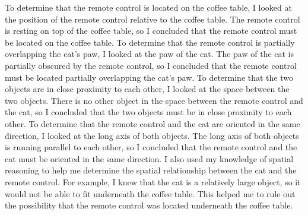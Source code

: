 \begin{enumerate}
{        To determine that the remote control is located on the coffee table, I looked at the position of the remote control relative to the coffee table. The remote control is resting on top of the coffee table, so I concluded that the remote control must be located on the coffee table.
        To determine that the remote control is partially overlapping the cat's paw, I looked at the paw of the cat. The paw of the cat is partially obscured by the remote control, so I concluded that the remote control must be located partially overlapping the cat's paw.
        To determine that the two objects are in close proximity to each other, I looked at the space between the two objects. There is no other object in the space between the remote control and the cat, so I concluded that the two objects must be in close proximity to each other.
        To determine that the remote control and the cat are oriented in the same direction, I looked at the long axis of both objects. The long axis of both objects is running parallel to each other, so I concluded that the remote control and the cat must be oriented in the same direction.
        I also used my knowledge of spatial reasoning to help me determine the spatial relationship between the cat and the remote control. For example, I knew that the cat is a relatively large object, so it would not be able to fit underneath the coffee table. This helped me to rule out the possibility that the remote control was located underneath the coffee table.}
    \end{enumerate}
